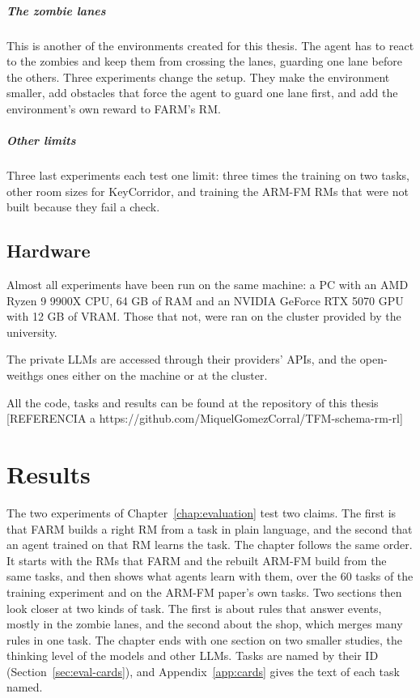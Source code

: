 \documentclass[11pt,english,listoffigures,listoftables]{tfgetsinf}
\begin{document}
\paragraph{The zombie lanes} This is another of the environments created for this thesis. The agent has to react to the zombies and keep them from crossing the lanes, guarding one lane before the others. Three experiments change the setup. They make the environment smaller, add obstacles that force the agent to guard one lane first, and add the environment's own reward to FARM's RM.

\paragraph{Other limits} Three last experiments each test one limit: three times the training on two tasks, other room sizes for KeyCorridor, and training the ARM-FM RMs that were not built because they fail a check.

\section{Hardware}
Almost all experiments have been run on the same machine: a PC with an AMD Ryzen 9 9900X CPU, 64 GB of RAM and an NVIDIA GeForce RTX 5070 GPU with 12 GB of VRAM. Those that not, were ran on the cluster provided by the university. 

The private LLMs are accessed through their providers' APIs, and the open-weithgs ones either on the machine or at the cluster. 

All the code, tasks and results can be found at the repository of this thesis [REFERENCIA a https://github.com/MiquelGomezCorral/TFM-schema-rm-rl]


\chapter{Results}
\label{chap:results}

The two experiments of Chapter~\ref{chap:evaluation} test two claims. The first is that FARM builds a right RM from a task in plain language, and the second that an agent trained on that RM learns the task. The chapter follows the same order. It starts with the RMs that FARM and the rebuilt ARM-FM build from the same tasks, and then shows what agents learn with them, over the 60 tasks of the training experiment and on the ARM-FM paper's own tasks. Two sections then look closer at two kinds of task. The first is about rules that answer events, mostly in the zombie lanes, and the second about the shop, which merges many rules in one task. The chapter ends with one section on two smaller studies, the thinking level of the models and other LLMs. Tasks are named by their ID (Section~\ref{sec:eval-cards}), and Appendix~\ref{app:cards} gives the text of each task named.
\end{document}
